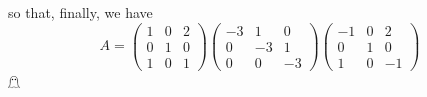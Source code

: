 \documentclass{article}
\begin{document}
\begin{itemize}
    so that, finally, we have
    \[A = \begin{pmatrix}
        1 & 0 & 2\\
        0 & 1 & 0\\
        1 & 0 & 1
    \end{pmatrix}\begin{pmatrix}
        -3 & 1 & 0\\
        0 & -3 & 1\\
        0 & 0 & -3
    \end{pmatrix}\begin{pmatrix}
        -1 & 0 & 2\\
        0 & 1 & 0\\
        1 & 0 & -1
    \end{pmatrix}\]
    \hfill $\mathghost$
    

\end{itemize}
\end{document}
